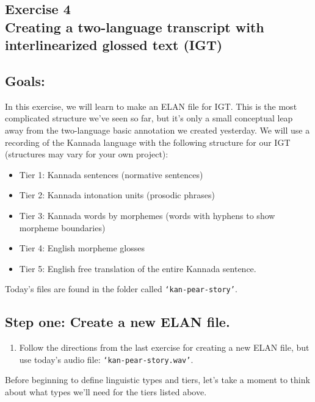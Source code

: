 \documentclass[letterpaper,12pt]{article}
\begin{document}
\begin{center}
\section*{Exercise 4\\Creating a two-language transcript with interlinearized glossed text (IGT)}
\end{center}

\subsection*{Goals:}
In this exercise, we will learn to make an ELAN file for IGT. This is the most complicated structure we've seen so far, but it's only a small conceptual leap away from the two-language basic annotation we created yesterday. We will use a recording of the Kannada language with the following structure for our IGT (structures may vary for your own project):
\begin{itemize}
\item[] Tier 1: Kannada sentences (normative sentences)
\item[] Tier 2: Kannada intonation units (prosodic phrases)
\item[] Tier 3: Kannada words by morphemes (words with hyphens to show morpheme boundaries)
\item[] Tier 4: English morpheme glosses
\item[] Tier 5: English free translation of the entire Kannada sentence.
\end{itemize}

\noindent Today's files are found in the folder called \texttt{`kan-pear-story'}.
\subsection*{Step one: Create a new ELAN file.}

\begin{enumerate} 
\item Follow the directions from the last exercise for creating a new ELAN file, but use today's audio file: \texttt{`kan-pear-story.wav'}.
\end{enumerate}

\noindent Before beginning to define linguistic types and tiers, let's take a moment to think about what types we'll need for the tiers listed above.
\end{document}

